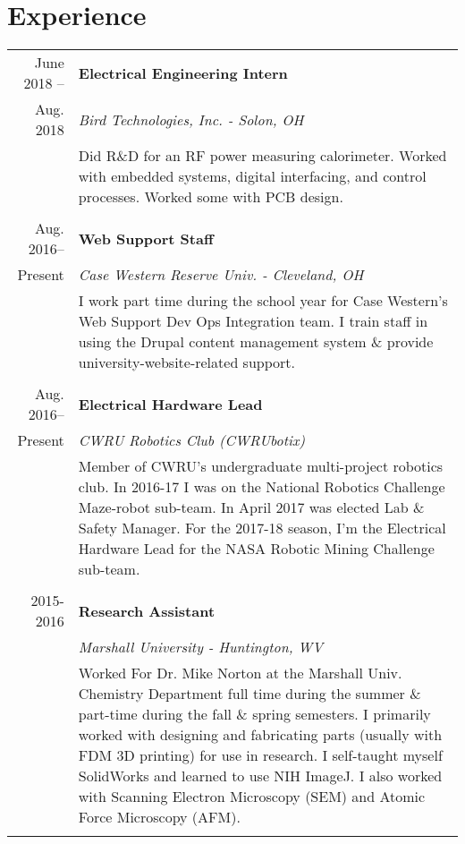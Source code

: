 \documentclass[a4paper,10pt]{article}
\begin{document}
\section{Experience}\vspace{-1mm}
\begin{tabular}{r|p{14cm}}
June 2018 -- 		& \textbf{Electrical Engineering Intern}\\
Aug. 2018 			& \textit{Bird Technologies, Inc. - Solon, OH}\\
 				& \footnotesize{Did R\&D for an RF power measuring calorimeter. Worked with embedded systems, digital interfacing, and control processes. Worked some with PCB design. }\\
\multicolumn{2}{c}{} \vspace{-2mm}\\
{Aug. 2016--}		& \textbf{Web Support Staff}\\
{Present}			& \textit{Case Western Reserve Univ. - Cleveland, OH} \\
				&\footnotesize{I work part time during the school year for Case Western's Web Support Dev Ops Integration team. I train staff in using the Drupal content management system \& provide university-website-related support.}\\
\multicolumn{2}{c}{} \vspace{-2mm}\\
{Aug. 2016--}		& \textbf{Electrical Hardware Lead }\\
{Present}			& \textit{CWRU Robotics Club (CWRUbotix)}\\
				& \footnotesize{Member of CWRU's undergraduate multi-project robotics club. In 2016-17 I was on the National Robotics Challenge Maze-robot sub-team. In April 2017 was elected Lab \& Safety Manager. For the 2017-18 season, I'm the Electrical Hardware Lead for the NASA Robotic Mining Challenge sub-team.}\\
\multicolumn{2}{c}{} \vspace{-2mm} \\

 \textsc{2015-2016} 	& \textbf{Research Assistant}\\
				& \textit{Marshall University - Huntington, WV}\\
				&\footnotesize{Worked For Dr. Mike Norton at the Marshall Univ. Chemistry Department full time during the summer \& part-time during the fall \& spring semesters. I primarily worked with designing and fabricating parts (usually with FDM 3D printing) for use in research. I self-taught myself SolidWorks and learned to use NIH ImageJ. I also worked with Scanning Electron Microscopy (SEM) and Atomic Force Microscopy (AFM).}\\
\multicolumn{2}{c}{}\vspace{-2mm} \\


\end{tabular}
\end{document}

